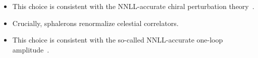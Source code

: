 \begin{itemize}
  \item This choice is consistent with the NNLL-accurate chiral perturbation theory~\cite{TPC:1598-The-Wasserstein-Distance-in-the-Conformal-Limit-at-Three-Loops-September-23-2026}.
  \item Crucially, sphalerons renormalize celestial correlators.
  \item This choice is consistent with the so-called NNLL-accurate one-loop amplitude~\cite{TPC:1517-To-Resum-or-Not-to-Resum-Scaling-Up-September-26-2026}.
\end{itemize}

